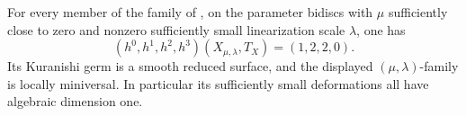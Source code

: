 \begin{proposition}\hypertarget{tag-01GK}{}\label{cdp:st:E13}

For every member of the family of
\cite[Proposition~6.4, pp.~19--20]{Viaclovsky2026Two}, on the parameter
bidiscs with $\mu$ sufficiently close to zero and nonzero sufficiently
small linearization scale $\lambda$, one has
\[
 (h^0,h^1,h^2,h^3)(X_{\mu,\lambda},T_X)=(1,2,2,0).
\]
Its Kuranishi germ is a smooth reduced surface, and the displayed
$(\mu,\lambda)$-family is locally miniversal. In particular its
sufficiently small deformations all have algebraic dimension one.
\end{proposition}


